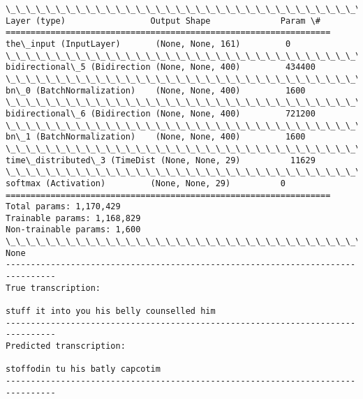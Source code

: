 \documentclass[11pt]{article}
\begin{document}
    \begin{Verbatim}[commandchars=\\\{\}]
\_\_\_\_\_\_\_\_\_\_\_\_\_\_\_\_\_\_\_\_\_\_\_\_\_\_\_\_\_\_\_\_\_\_\_\_\_\_\_\_\_\_\_\_\_\_\_\_\_\_\_\_\_\_\_\_\_\_\_\_\_\_\_\_\_
Layer (type)                 Output Shape              Param \#   
=================================================================
the\_input (InputLayer)       (None, None, 161)         0         
\_\_\_\_\_\_\_\_\_\_\_\_\_\_\_\_\_\_\_\_\_\_\_\_\_\_\_\_\_\_\_\_\_\_\_\_\_\_\_\_\_\_\_\_\_\_\_\_\_\_\_\_\_\_\_\_\_\_\_\_\_\_\_\_\_
bidirectional\_5 (Bidirection (None, None, 400)         434400    
\_\_\_\_\_\_\_\_\_\_\_\_\_\_\_\_\_\_\_\_\_\_\_\_\_\_\_\_\_\_\_\_\_\_\_\_\_\_\_\_\_\_\_\_\_\_\_\_\_\_\_\_\_\_\_\_\_\_\_\_\_\_\_\_\_
bn\_0 (BatchNormalization)    (None, None, 400)         1600      
\_\_\_\_\_\_\_\_\_\_\_\_\_\_\_\_\_\_\_\_\_\_\_\_\_\_\_\_\_\_\_\_\_\_\_\_\_\_\_\_\_\_\_\_\_\_\_\_\_\_\_\_\_\_\_\_\_\_\_\_\_\_\_\_\_
bidirectional\_6 (Bidirection (None, None, 400)         721200    
\_\_\_\_\_\_\_\_\_\_\_\_\_\_\_\_\_\_\_\_\_\_\_\_\_\_\_\_\_\_\_\_\_\_\_\_\_\_\_\_\_\_\_\_\_\_\_\_\_\_\_\_\_\_\_\_\_\_\_\_\_\_\_\_\_
bn\_1 (BatchNormalization)    (None, None, 400)         1600      
\_\_\_\_\_\_\_\_\_\_\_\_\_\_\_\_\_\_\_\_\_\_\_\_\_\_\_\_\_\_\_\_\_\_\_\_\_\_\_\_\_\_\_\_\_\_\_\_\_\_\_\_\_\_\_\_\_\_\_\_\_\_\_\_\_
time\_distributed\_3 (TimeDist (None, None, 29)          11629     
\_\_\_\_\_\_\_\_\_\_\_\_\_\_\_\_\_\_\_\_\_\_\_\_\_\_\_\_\_\_\_\_\_\_\_\_\_\_\_\_\_\_\_\_\_\_\_\_\_\_\_\_\_\_\_\_\_\_\_\_\_\_\_\_\_
softmax (Activation)         (None, None, 29)          0         
=================================================================
Total params: 1,170,429
Trainable params: 1,168,829
Non-trainable params: 1,600
\_\_\_\_\_\_\_\_\_\_\_\_\_\_\_\_\_\_\_\_\_\_\_\_\_\_\_\_\_\_\_\_\_\_\_\_\_\_\_\_\_\_\_\_\_\_\_\_\_\_\_\_\_\_\_\_\_\_\_\_\_\_\_\_\_
None
--------------------------------------------------------------------------------
True transcription:

stuff it into you his belly counselled him
--------------------------------------------------------------------------------
Predicted transcription:

stoffodin tu his batly capcotim
--------------------------------------------------------------------------------

    \end{Verbatim}


    
    
    
    
\end{document}
